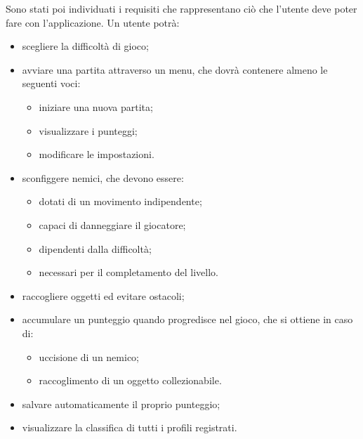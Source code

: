 Sono stati poi individuati i requisiti che rappresentano ciò che l'utente deve poter fare con l'applicazione.
Un utente potrà:
\begin{itemize}
	\item scegliere la difficoltà di gioco;
	\item avviare una partita attraverso un menu, che dovrà contenere almeno le seguenti voci:
	\begin{itemize}
	    \item iniziare una nuova partita;
	    \item visualizzare i punteggi;
	    \item modificare le impostazioni.
	\end{itemize}
	\item sconfiggere nemici, che devono essere:
	\begin{itemize}
	    \item dotati di un movimento indipendente;
	    \item capaci di danneggiare il giocatore;
	    \item dipendenti dalla difficoltà;
	    \item necessari per il completamento del livello.
	\end{itemize}
	\item raccogliere oggetti ed evitare ostacoli;
	\item accumulare un punteggio quando progredisce nel gioco, che si ottiene in caso di:
	\begin{itemize}
	    \item uccisione di un nemico;
	    \item raccoglimento di un oggetto collezionabile.
	\end{itemize}
	\item salvare automaticamente il proprio punteggio;
	\item visualizzare la classifica di tutti i profili registrati.
\end{itemize}